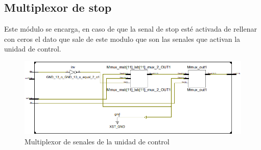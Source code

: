 \subsection{Multiplexor de stop}
Este m\'odulo se encarga, en caso de que la senal de stop est\'e activada de rellenar con ceros el dato que sale de este modulo que son las senales que activan la unidad de control.

\begin{figure}[H]
\centering
\includegraphics[scale=0.5]{img/multiplexor_inside}
\caption{Multiplexor de senales de la unidad de control}
\label{fig:sign_extended}
\end{figure}
